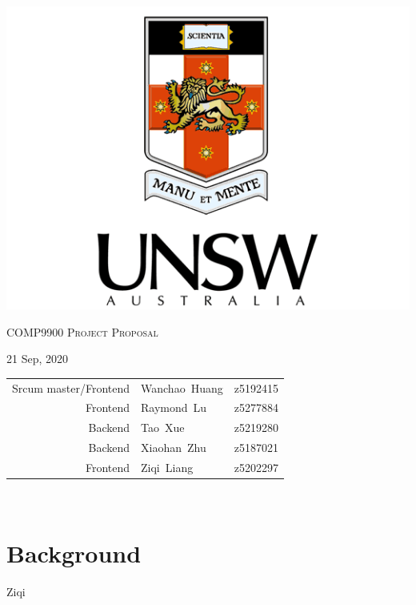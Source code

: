 \documentclass[12pt]{article}
\begin{document}
\begin{titlepage}
  \centering
  {\centering
    \includegraphics[height=0.3\textheight]{images/unsw.png}\par
  }
  \vspace{1cm}
  {\scshape\huge COMP9900 Project Proposal\par}
  \vspace{2cm}
  \large 21 Sep, 2020\\ 
  
  \begin{center}
    \renewcommand{\arraystretch}{1.5}
    \begin{tabular}{r l l} 
         Srcum master/Frontend& Wanchao\ Huang &z5192415\\
         Frontend             & Raymond\ Lu     &z5277884\\
         Backend              & Tao\ Xue       &z5219280\\
         Backend              & Xiaohan\ Zhu    &z5187021\\
         Frontend             & Ziqi\ Liang     &z5202297\\ 
    \end{tabular}\\
\end{center}
  \vspace{1cm}
\end{titlepage}

\tableofcontents
\newpage

\section{Background}
Ziqi
\end{document}
